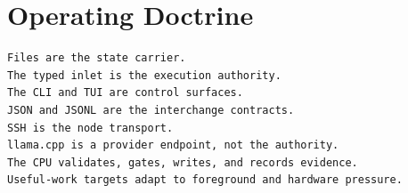\documentclass[11pt,a4paper]{article}
\begin{document}
\section*{Operating Doctrine}

\begin{lstlisting}[language={}]
Files are the state carrier.
The typed inlet is the execution authority.
The CLI and TUI are control surfaces.
JSON and JSONL are the interchange contracts.
SSH is the node transport.
llama.cpp is a provider endpoint, not the authority.
The CPU validates, gates, writes, and records evidence.
Useful-work targets adapt to foreground and hardware pressure.
\end{lstlisting}
\end{document}
